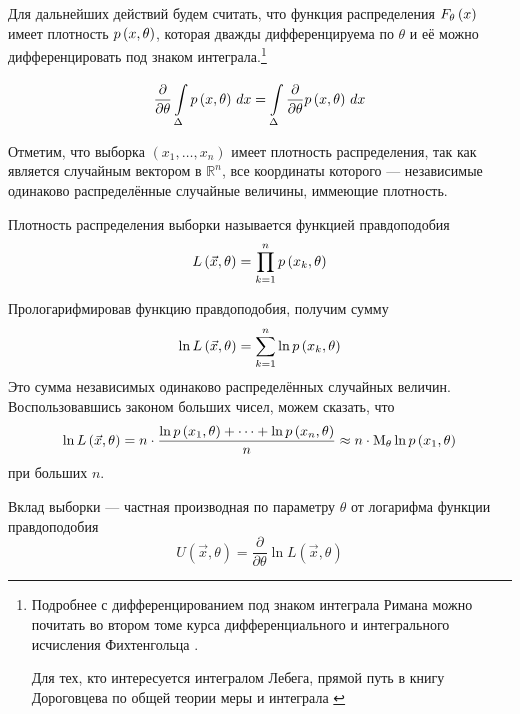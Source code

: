\begin{remark}\label{remark:doubleDiff}
  Для дальнейших действий будем считать, что функция распределения
  $\cdfof{\theta}{x}$ имеет плотность $\pdf{x,\theta}$,
  которая дважды дифференцируема по $\theta$ и её можно дифференцировать под
  знаком интеграла.\footnote{Подробнее с дифференцированием под знаком
  интеграла Римана можно почитать во втором томе курса дифференциального и
  интегрального исчисления Фихтенгольца
  \cite[с.~712]{Fichtenholz2}.

  Для тех, кто интересуется интегралом Лебега, прямой путь в книгу
  Дороговцева по общей теории меры и интеграла \cite[с.~102]{DorogovtsevIT}}

  \begin{equation*}
    \frac{\partial}{\partial \theta}\integrall{\Delta}{dx}{\pdf{x, \theta}}
    = \integrall{\Delta}{dx}{\frac{\partial}{\partial \theta}\pdf{x, \theta}}
  \end{equation*}
\end{remark}

Отметим, что выборка $\left( x_1, \dots, x_n \right)$ имеет плотность
распределения, так как является случайным вектором в $\mathbb{R}^n$,
все координаты которого --- независимые одинаково распределённые случайные
величины, иммеющие плотность.

\begin{definition}
  \label{def:likehoodFunction}
  Плотность распределения выборки называется функцией правдоподобия
  \begin{equation*}
    L\left( \vec{x}, \theta \right) = \prod_{k=1}^n \pdf{x_k, \theta}
  \end{equation*}
\end{definition}

Прологарифмировав функцию правдоподобия, получим сумму
\begin{equation*}
  \ln{L\left( \vec{x}, \theta \right)}
  = \sum_{k=1}^n \ln{\pdf{x_k, \theta}}
\end{equation*}
Это сумма независимых одинаково распределённых случайных величин.
Воспользовавшись законом больших чисел, можем сказать,
что
\begin{equation*}
  \ln{L\left( \vec{x}, \theta \right)}
  = n\cdot\frac{\ln{\pdf{x_1, \theta}} + \dots + \ln{\pdf{x_n, \theta}}}{n}
  \approx n\cdot\meanof{\theta}{\ln{\pdf{x_1, \theta}}}
\end{equation*}
при больших $n$.


\begin{definition}\label{def:defU}
  Вклад выборки --- частная производная по параметру $\theta$
  от логарифма функции правдоподобия
  $$U\left( \vec{x},\theta \right)
      =\frac{\partial}{\partial\theta}\ln{L\left(\vec{x},\theta\right)}$$
\end{definition}

